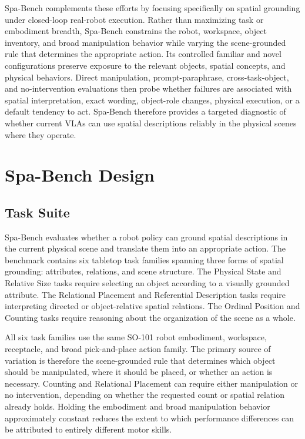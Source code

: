 \documentclass[conference]{IEEEtran}
\begin{document}
Spa-Bench complements these efforts by focusing specifically on spatial grounding under closed-loop real-robot execution. Rather than maximizing task or embodiment breadth, Spa-Bench constrains the robot, workspace, object inventory, and broad manipulation behavior while varying the scene-grounded rule that determines the appropriate action. Its controlled familiar and novel configurations preserve exposure to the relevant objects, spatial concepts, and physical behaviors. Direct manipulation, prompt-paraphrase, cross-task-object, and no-intervention evaluations then probe whether failures are associated with spatial interpretation, exact wording, object-role changes, physical execution, or a default tendency to act. Spa-Bench therefore provides a targeted diagnostic of whether current VLAs can use spatial descriptions reliably in the physical scenes where they operate.

\section{Spa-Bench Design}
\label{sec:spa_bench_design}

\subsection{Task Suite}

Spa-Bench evaluates whether a robot policy can ground spatial descriptions in the current physical scene and translate them into an appropriate action. The benchmark contains six tabletop task families spanning three forms of spatial grounding: attributes, relations, and scene structure. The Physical State and Relative Size tasks require selecting an object according to a visually grounded attribute. The Relational Placement and Referential Description tasks require interpreting directed or object-relative spatial relations. The Ordinal Position and Counting tasks require reasoning about the organization of the scene as a whole.

All six task families use the same SO-101 robot embodiment, workspace, receptacle, and broad pick-and-place action family. The primary source of variation is therefore the scene-grounded rule that determines which object should be manipulated, where it should be placed, or whether an action is necessary. Counting and Relational Placement can require either manipulation or no intervention, depending on whether the requested count or spatial relation already holds. Holding the embodiment and broad manipulation behavior approximately constant reduces the extent to which performance differences can be attributed to entirely different motor skills.
\end{document}
